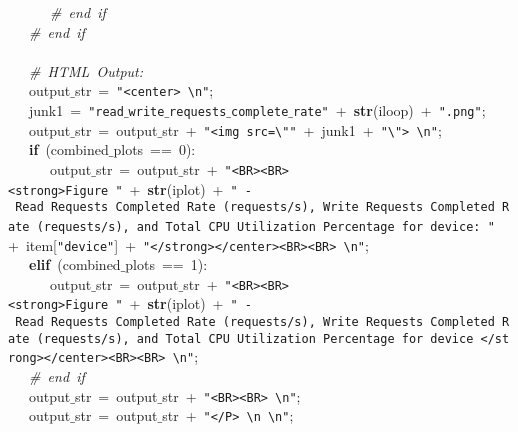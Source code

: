 \mbox{}\ \ \ \ \ \ \textit{\#\ end\ if} \\
\mbox{}\ \ \ \textit{\#\ end\ if} \\
\mbox{}\ \ \  \\
\mbox{}\ \ \ \textit{\#\ HTML\ Output:} \\
\mbox{}\ \ \ output$\_$str\ =\ \texttt{"{}\textless{}center\textgreater{}\ \textbackslash{}n"{}}; \\
\mbox{}\ \ \ junk1\ =\ \texttt{"{}read$\_$write$\_$requests$\_$complete$\_$rate"{}}\ +\ \textbf{str}(iloop)\ +\ \texttt{"{}.png"{}}; \\
\mbox{}\ \ \ output$\_$str\ =\ output$\_$str\ +\ \texttt{"{}\textless{}img\ src=\textbackslash{}"{}"{}}\ +\ junk1\ +\ \texttt{"{}\textbackslash{}"{}\textgreater{}\ \textbackslash{}n"{}}; \\
\mbox{}\ \ \ \textbf{if}\ (combined$\_$plots\ ==\ 0): \\
\mbox{}\ \ \ \ \ \ output$\_$str\ =\ output$\_$str\ +\ \texttt{"{}\textless{}BR\textgreater{}\textless{}BR\textgreater{}\textless{}strong\textgreater{}Figure\ "{}}\ +\ \textbf{str}(iplot)\ +\ \texttt{"{}\ -\ Read\ Requests\ Completed\ Rate\ (requests/s),\ Write\ Requests\ Completed\ Rate\ (requests/s),\ and\ Total\ CPU\ Utilization\ Percentage\ for\ device:\ "{}}\ +\ item[\texttt{"{}device"{}}]\ +\ \texttt{"{}\textless{}/strong\textgreater{}\textless{}/center\textgreater{}\textless{}BR\textgreater{}\textless{}BR\textgreater{}\ \textbackslash{}n"{}}; \\
\mbox{}\ \ \ \textbf{elif}\ (combined$\_$plots\ ==\ 1): \\
\mbox{}\ \ \ \ \ \ output$\_$str\ =\ output$\_$str\ +\ \texttt{"{}\textless{}BR\textgreater{}\textless{}BR\textgreater{}\textless{}strong\textgreater{}Figure\ "{}}\ +\ \textbf{str}(iplot)\ +\ \texttt{"{}\ -\ Read\ Requests\ Completed\ Rate\ (requests/s),\ Write\ Requests\ Completed\ Rate\ (requests/s),\ and\ Total\ CPU\ Utilization\ Percentage\ for\ device\ \textless{}/strong\textgreater{}\textless{}/center\textgreater{}\textless{}BR\textgreater{}\textless{}BR\textgreater{}\ \textbackslash{}n"{}}; \\
\mbox{}\ \ \ \textit{\#\ end\ if} \\
\mbox{}\ \ \ output$\_$str\ =\ output$\_$str\ +\ \texttt{"{}\textless{}BR\textgreater{}\textless{}BR\textgreater{}\ \textbackslash{}n"{}}; \\
\mbox{}\ \ \ output$\_$str\ =\ output$\_$str\ +\ \texttt{"{}\textless{}/P\textgreater{}\ \textbackslash{}n\ \textbackslash{}n"{}}; \\

